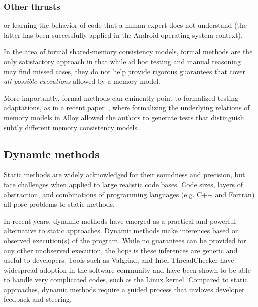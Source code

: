 \subsubsection{Other thrusts }

or learning the behavior of code that a human expert
does not understand (the latter has been
successfully applied in the Android 
operating system context).

In the area of formal shared-memory consistency models, formal methods are the only satisfactory approach in that while ad hoc testing and manual reasoning may find missed cases, they do not help provide rigorous guarantees that cover {\em all possible executions} allowed by a memory model.

More importantly, formal methods can eminently 
point to formalized testing adaptations, as
in a recent paper~\cite{DBLP:conf/popl/WickersonBSC17}, where formalizing the underlying relations
of memory models in Alloy
allowed the authors to generate tests that
distinguish subtly different 
memory consistency models.

 \subsection{Dynamic methods}
 
\label{sec:dynamic-methods}

Static methods are widely  acknowledged for their soundness and precision, but  face challenges when applied to large realistic code  bases.  Code sizes,  layers of abstraction, and  combinations of programming languages (e.g. C++ and Fortran) all pose problems to  static methods. 

In recent  years, dynamic methods have emerged as a practical and  powerful alternative to  static approaches. Dynamic methods  make  inferences based on  observed execution(s) of the program. While  no  guarantees can  be provided for any other unobserved execution, the hope is these inferences  are generic and useful to developers. Tools such as Valgrind,   and Intel ThreadChecker have widespread adoption in the software community and have been shown to be able to handle very complicated codes, such as the Linux kernel. Compared to static approaches, dynamic methods require a  guided process that invloves developer feedback and steering.

